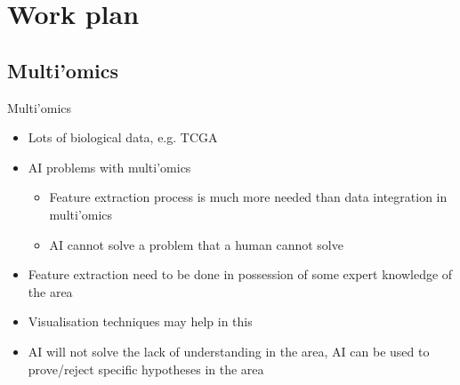 \documentclass[hyperref={colorlinks=true}]{beamer}
\begin{document}
\section{Work plan}

\subsection{Multi'omics}
\begin{frame}{Multi'omics}
  \begin{itemize}
    \item Lots of biological data, e.g. TCGA
    \item AI problems with multi'omics
      \begin{itemize}
        \item Feature extraction process is much more needed than data
              integration in multi'omics
        \item AI cannot solve a problem that a human cannot solve
      \end{itemize}
    \pause
    \item Feature extraction need to be done in possession of some expert
          knowledge of the area
    \item Visualisation techniques may help in this
    \item AI will not solve the lack of understanding in the area, AI can be
          used to prove/reject specific hypotheses in the area
  \end{itemize}
\end{frame}
\end{document}
